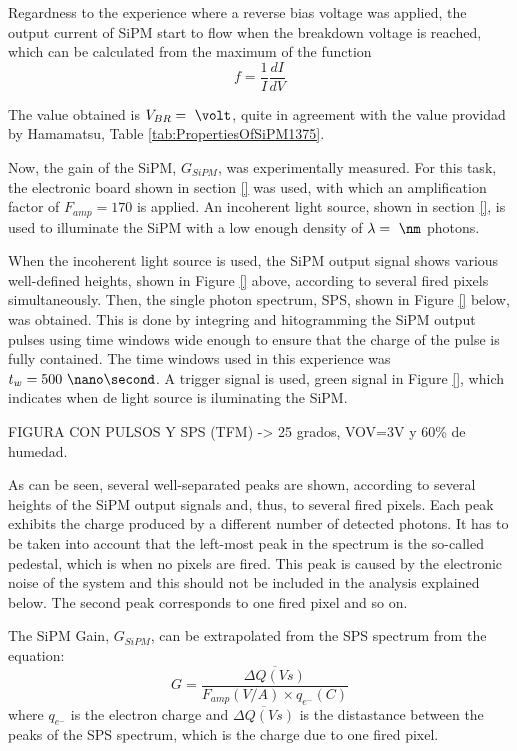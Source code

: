 Regardness to the experience where a reverse bias voltage was applied, the output current of SiPM start to flow when the breakdown voltage is reached, which can be calculated from the maximum of the function 
\begin{equation}
f=\frac{1}{I}\frac{dI}{dV}
\label{BreakDownVoltageFunction}
\end{equation}

The value obtained is $V_{BR}=~\volt$, quite in agreement with the value providad by Hamamatsu, Table \ref{tab:PropertiesOfSiPM1375}.

Now, the gain of the SiPM, $G_{SiPM}$, was experimentally measured. For this task, the electronic board shown in section \ref{} was used, with which an amplification factor of $F_{amp}=170$ is applied. An incoherent light source, shown in section \ref{}, is used to illuminate the SiPM with a low enough density of $\lambda= ~\nm$ photons.

When the incoherent light source is used, the SiPM output signal shows various well-defined heights, shown in Figure \ref{} above, according to several fired pixels simultaneously. Then, the single photon spectrum, SPS, shown in Figure \ref{} below, was obtained. This is done by integring and hitogramming the SiPM output pulses using time windows wide enough to ensure that the charge of the pulse is fully contained. The time windows used in this experience was $t_w= 500~\nano\second$. A trigger signal is used, green signal in Figure \ref{}, which indicates when de light source is iluminating the SiPM.

FIGURA CON PULSOS Y SPS (TFM) -> 25 grados, VOV=3V y 60\% de humedad.

As can be seen, several well-separated peaks are shown, according to several heights of the SiPM output signals and, thus, to several fired pixels. Each peak exhibits the charge produced by a different number of detected photons. It has to be taken into account that the left-most peak in the spectrum is the so-called pedestal, which is when no pixels are fired. This peak is caused by the electronic noise of the system and this should not be included in the analysis explained below. The second peak corresponds to one fired pixel and so on.

The SiPM Gain, $G_{SiPM}$, can be extrapolated from the SPS spectrum from the equation:
\begin{equation}
G=\frac{\overline{\Delta Q (Vs)}}{F_{amp}(V/A) \times q_{e^-}(C)}
\label{SiPMGain}
\end{equation}
where $q_{e^-}$ is the electron charge and $\overline{\Delta Q (Vs)}$ is the distastance between the peaks of the SPS spectrum, which is the charge due to one fired pixel. 


